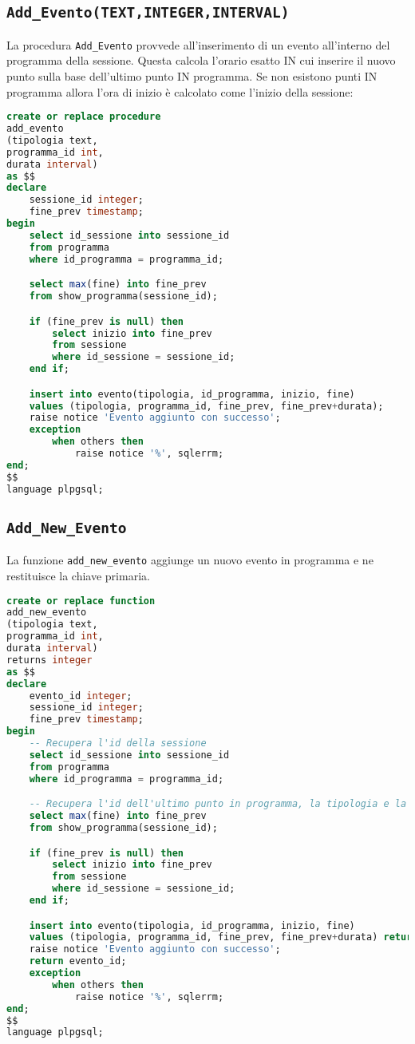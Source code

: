 \subsection{\texttt{Add\_Evento(TEXT,INTEGER,INTERVAL)}}
La procedura \texttt{Add\_Evento} provvede all'inserimento di un evento all'interno del programma della sessione. Questa calcola l'orario esatto IN cui inserire il nuovo punto sulla base dell'ultimo punto IN programma. Se non esistono punti IN programma allora l'ora di inizio è calcolato come l'inizio della sessione:
\begin{lstlisting}[language=SQL,style=mystyle]
create or replace procedure 
add_evento
(tipologia text, 
programma_id int, 
durata interval)
as $$
declare
    sessione_id integer;
    fine_prev timestamp;
begin
    select id_sessione into sessione_id
    from programma
    where id_programma = programma_id;

    select max(fine) into fine_prev
    from show_programma(sessione_id);

    if (fine_prev is null) then
        select inizio into fine_prev
        from sessione
        where id_sessione = sessione_id;
    end if;

    insert into evento(tipologia, id_programma, inizio, fine)
    values (tipologia, programma_id, fine_prev, fine_prev+durata);
    raise notice 'Evento aggiunto con successo';
    exception
        when others then
            raise notice '%', sqlerrm;
end;
$$
language plpgsql;
\end{lstlisting}
\subsection{\texttt{Add\_New\_Evento}}
La funzione \texttt{add\_new\_evento} aggiunge un nuovo evento in programma e ne restituisce la chiave primaria.
\begin{lstlisting}[language=SQL,style=mystyle]
create or replace function
add_new_evento
(tipologia text, 
programma_id int, 
durata interval)
returns integer
as $$
declare
    evento_id integer;
    sessione_id integer;
    fine_prev timestamp;
begin
    -- Recupera l'id della sessione
    select id_sessione into sessione_id
    from programma
    where id_programma = programma_id;

    -- Recupera l'id dell'ultimo punto in programma, la tipologia e la fine
    select max(fine) into fine_prev
    from show_programma(sessione_id);

    if (fine_prev is null) then
        select inizio into fine_prev
        from sessione
        where id_sessione = sessione_id;
    end if;

    insert into evento(tipologia, id_programma, inizio, fine)
    values (tipologia, programma_id, fine_prev, fine_prev+durata) returning id_evento into evento_id;
    raise notice 'Evento aggiunto con successo';
    return evento_id;
    exception
        when others then
            raise notice '%', sqlerrm;
end;
$$
language plpgsql;
\end{lstlisting}
